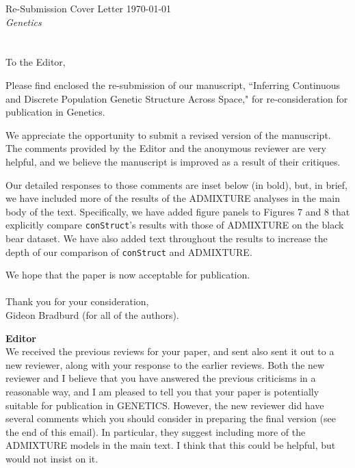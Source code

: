 \documentclass[11pt]{letter}
\begin{document}
Re-Submission Cover Letter \hfill	\today\\
\emph{Genetics}
\\\\\\
To the Editor,

Please find enclosed the re-submission of our manuscript, 
``Inferring Continuous and Discrete Population Genetic Structure Across Space,"
for re-consideration for publication in Genetics.

We appreciate the opportunity to submit a revised version of the manuscript.  
The comments provided by the Editor 
and the anonymous reviewer are very helpful, 
and we believe the manuscript is improved as a result 
of their critiques.

Our detailed responses to those comments are inset below (in bold), 
but, in brief, we have included more of the results of the ADMIXTURE analyses 
in the main body of the text.
Specifically, we have added figure panels to Figures 7 and 8 
that explicitly compare \texttt{conStruct}'s results with those of ADMIXTURE 
on the black bear dataset.
We have also added text throughout the results to increase the depth of 
our comparison of \texttt{conStruct} and ADMIXTURE.

We hope that the paper is now acceptable for publication.\\\\
%


Thank you for your consideration,\\
Gideon Bradburd (for all of the authors).

\newpage

\textbf{Editor}\\
We received the previous reviews for your paper, and sent also sent it out to a new reviewer, along with your response to the earlier reviews. Both the new reviewer and I believe that you have answered the previous criticisms in a reasonable way, and I am pleased to tell you that your paper is potentially suitable for publication in GENETICS. However, the new reviewer did have several comments which you should consider in preparing the final version (see the end of this email). In particular, they suggest including more of the ADMIXTURE models in the main text. I think that this could be helpful, but would not insist on it.
\end{document}
